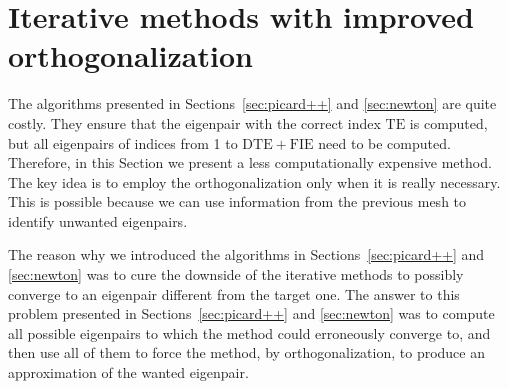 \documentclass[smallextended]{svjour3}
\begin{document}
\begin{algorithm}[!ht]
\begin{algorithmic}



\ENDFOR
{}

\end{algorithmic}
\end{algorithm}

\section{Iterative methods with improved orthogonalization}\label{sec:imp_ortho}

The algorithms presented in Sections~\ref{sec:picard++} and \ref{sec:newton} are quite costly. 
They ensure that the eigenpair with the correct index $\mathrm{TE}$ is computed, but all eigenpairs 
of indices from 1 to $\mathrm{DTE}+\mathrm{FIE}$ need to be computed. Therefore, in this Section we 
present a less computationally expensive method. The key idea is to employ the orthogonalization only 
when it is really necessary. This is possible because we can use information from the previous 
mesh to identify unwanted eigenpairs.

The reason why we introduced the algorithms in Sections~\ref{sec:picard++} and \ref{sec:newton} was to cure the downside of the iterative methods to possibly converge to an eigenpair different from the target one. The answer to this problem presented in Sections~\ref{sec:picard++} and \ref{sec:newton} was to compute all possible eigenpairs to which the method could erroneously converge to, and then use all of them to force the method, by orthogonalization, to produce an approximation of the wanted eigenpair. 
\end{document}

